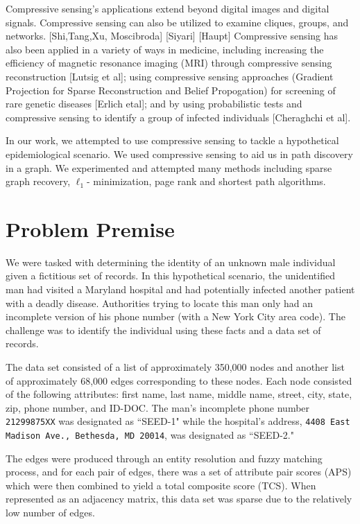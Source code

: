 \documentclass{article} %
\begin{document}
Compressive sensing's applications extend beyond digital images and digital signals. Compressive sensing can also be utilized to examine cliques, groups, and networks. [Shi,Tang,Xu, Moscibroda] [Siyari] [Haupt] Compressive sensing has also been applied in a variety of ways in medicine, including increasing the efficiency of magnetic resonance imaging (MRI) through compressive sensing reconstruction [Lutsig et al]; using compressive sensing approaches (Gradient Projection for Sparse Reconstruction and Belief Propogation) for screening of rare genetic diseases [Erlich etal]; and by using probabilistic tests and compressive sensing to identify a group of infected individuals [Cheraghchi et al]. 

In our work, we attempted to use compressive sensing to tackle a hypothetical epidemiological scenario. We used compressive sensing to aid us in path discovery in a graph. We experimented and attempted many methods including sparse graph recovery, $\ell_1$- minimization, page rank and shortest path algorithms.


\section{Problem Premise}




We were tasked with determining the identity of an unknown male individual given a fictitious set of records. In this hypothetical scenario, the unidentified man had visited a Maryland hospital and had potentially infected another patient with a deadly disease. Authorities trying to locate this man only had an incomplete version of his phone number (with a New York City area code). The challenge was to identify the individual using these facts and a data set of records. 




The data set consisted of a list of approximately 350,000 nodes and another list of approximately 68,000 edges corresponding to these nodes. Each node consisted of the following attributes: first name, last name, middle name, street, city, state, zip, phone number, and ID-DOC. The man's incomplete phone number \texttt{21299875XX} was designated as ``SEED-1" while the hospital's address, \texttt{4408 East Madison Ave., Bethesda, MD 20014}, was designated as ``SEED-2."




The edges were produced through an entity resolution and fuzzy matching process, and for each pair of edges, there was a set of attribute pair scores (APS) which were then combined to yield a total composite score (TCS). When represented as an adjacency matrix, this data set was sparse due to the relatively low number of edges.
\end{document}
